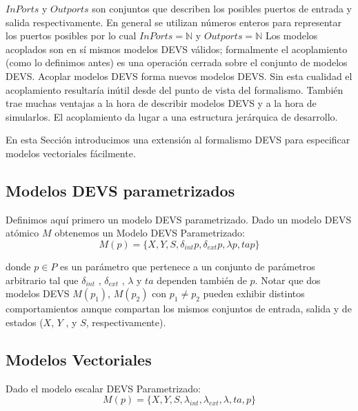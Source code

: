 \documentclass[a4paper,	11pt]{report}
\begin{document}
$InPorts$ y $Outports$ son conjuntos que describen los posibles puertos de entrada y salida respectivamente. En general se utilizan números enteros para representar los puertos posibles por lo cual $InPorts = \mathbb{N}$ y $Outports = \mathbb{N}$ Los modelos acoplados son en sí mismos modelos DEVS válidos; formalmente el acoplamiento (como lo definimos antes) es una operación cerrada sobre el conjunto de modelos DEVS. Acoplar modelos DEVS forma nuevos modelos DEVS. Sin esta cualidad el acoplamiento resultaría inútil desde del punto de vista del formalismo. También trae muchas ventajas a la hora de describir modelos DEVS y a la hora de simularlos. El acoplamiento da lugar a una estructura jerárquica de desarrollo.


En esta Sección introducimos una extensión al formalismo DEVS para especificar modelos vectoriales fácilmente.

\subsection{Modelos DEVS parametrizados}
Definimos aquí primero un modelo DEVS parametrizado. Dado un modelo DEVS atómico $M$ obtenemos un Modelo DEVS Parametrizado:
\begin{equation}
M (p) = \{X, Y, S, \delta_{int} p , \delta_{ext} p ,\lambda p , ta p\}
\end{equation}

donde $p \in P$ es un parámetro que pertenece a un conjunto de parámetros arbitrario tal que $\delta_{int}$ , $\delta_{ext}$ , $\lambda$ y $ta$ dependen también de $p$.
Notar que dos modelos DEVS $M (p_1 )$, $M (p_2 )$ con $p_1 \neq p_2$ pueden exhibir distintos comportamientos aunque compartan los mismos conjuntos de entrada, salida y de estados ($X$, $Y$ , y $S$, respectivamente).

\subsection{Modelos Vectoriales}
Dado el modelo escalar DEVS Parametrizado:
\begin{equation}
M (p) = \{X, Y, S, \lambda_{int} , \lambda_{ext} , \lambda, ta, p\}
\end{equation}
\end{document}
